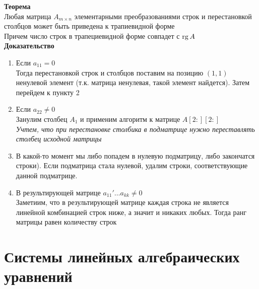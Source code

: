 \documentclass[12pt]{article}
\begin{document}
\textbf{Теорема}\\
Любая матрица $A_{m\times n}$ элементарными преобразованиями строк и перестановкой столбцов может быть приведена к трапиевидной форме\\
Причем число строк в трапециевидной форме совпадет с $\operatorname{rg} A$\\
\textbf{Доказательство}
\begin{enumerate}
    \item Если $a_{11} = 0$\\ 
    Тогда перестановкой строк и столбцов поставим на позицию $(1,1)$ ненулевой элемент (т.к. матрица ненулевая, такой элемент найдется). Затем перейдем к пункту 2
    \item Если $a_{22} \neq 0$\\
    Занулим столбец $A_1$ и применим алгоритм к матрице $A[2:][2:]$\\
    \textit{Учтем, что при перестановке столбика в подматрице нужно переставлять столбец исходной матрицы}
    \item В какой-то момент мы либо попадем в нулевую подматрицу, либо закончатся строки). Если подматрица стала нулевой, удалим строки, соответствующие данной подматрице.
    \item В результирующей матрице $a_{11}'\ldots a_{kk} \neq 0$\\
    Заметиим, что в результирующей матрице каждая строка не является линейной комбинацией строк ниже, а значит и никаких любых. Тогда ранг матрицы равен количеству строк
\end{enumerate}
\section{Системы линейных алгебраических уравнений}
\end{document}
